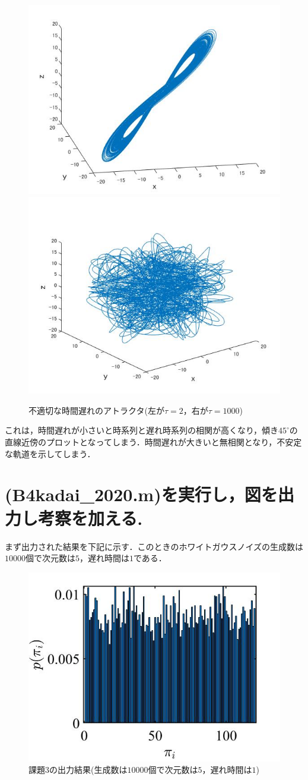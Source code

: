 \documentclass[autodetect-engine,dvipdfmx-if-dvi,ja=standard,a4paper,11pt]{bxjsarticle} %
\begin{document}
\begin{figure}[H]%
\begin{center}
\includegraphics[width=.4\textwidth]{kadai2_rusult3.jpg}
\includegraphics[width=.4\textwidth]{kadai2_rusult4.jpg}
\end{center}
\caption{不適切な時間遅れのアトラクタ(左が$\tau=2$，右が$\tau=1000$)}%
\label{fig:kadai24}
\end{figure}


これは，時間遅れが小さいと時系列と遅れ時系列の相関が高くなり，傾き$45^\circ$の直線近傍のプロットとなってしまう．時間遅れが大きいと無相関となり，不安定な軌道を示してしまう．

\section{(B4kadai\_2020.m)を実行し，図を出力し考察を加える.}
まず出力された結果を下記に示す．このときのホワイトガウスノイズの生成数は$10000$個で次元数は$5$，遅れ時間は$1$である．

\begin{figure}[H]%
\begin{center}
\includegraphics[width=.4\textwidth]{kadai3_rusult.jpg}
\end{center}
\caption{課題3の出力結果(生成数は$10000$個で次元数は$5$，遅れ時間は$1$)}%
\label{fig:kadai3}
\end{figure}
\end{document}
